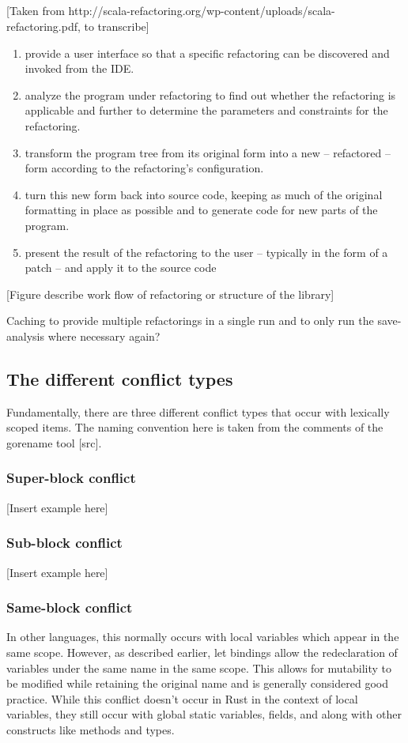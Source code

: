 \subsection{}
[Taken from http://scala-refactoring.org/wp-content/uploads/scala-refactoring.pdf, to transcribe]
\begin{enumerate}
\item provide a user interface so that a specific refactoring can be discovered and
invoked from the IDE.
\item analyze the program under refactoring to find out whether the refactoring is
applicable  and  further  to  determine  the  parameters  and  constraints  for  the
refactoring.
\item transform the program tree from its original form into a new – refactored – form
according to the refactoring’s configuration.
\item turn this new form back into source code,  keeping as much of the original
formatting in place as possible and to generate code for new parts of the program.
\item present the result of the refactoring to the user – typically in the form of a patch –
and apply it to the source code
\end{enumerate}

[Figure describe work flow of refactoring or structure of the library]

Caching to provide multiple refactorings in a single run and to only run the save-analysis where necessary again?

\subsection{The different conflict types}
Fundamentally, there are three different conflict types that occur with lexically scoped items. The naming convention here is taken from the comments of the gorename tool [src].

\subsubsection{Super-block conflict}
[Insert example here]

\subsubsection{Sub-block conflict}
[Insert example here]

\subsubsection{Same-block conflict}
In other languages, this normally occurs with local variables which appear in the same scope. However, as described earlier, let bindings allow the redeclaration of variables under the same name in the same scope. This allows for mutability to be modified while retaining the original name and is generally considered good practice. While this conflict doesn't occur in Rust in the context of local variables, they still occur with global static variables, fields, and along with other constructs like methods and types.


